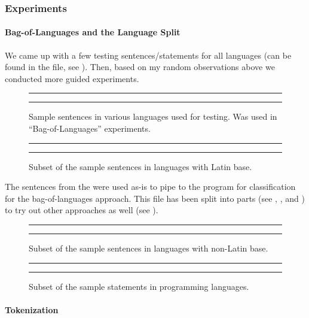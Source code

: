 \subsubsection{Experiments}

\paragraph{Bag-of-Languages and the Language Split}

We came up with a few testing sentences/statements for all languages
(can be found in the  file, see ).
Then, based on my random observations above we conducted more guided experiments.

\begin{figure}\small
\hrule\vskip4pt

\caption{Sample sentences in various languages used for testing. Was used in ``Bag-of-Languages'' experiments.}
\label{fig:lang-ident-sentences}
\vskip4pt\hrule
\end{figure}

\begin{figure}\small
\hrule\vskip4pt

\caption{Subset of the sample sentences in languages with Latin base.}
\label{fig:lang-ident-latin}
\vskip4pt\hrule
\end{figure}

The sentences from the  were used as-is to pipe to
the program for classification for the bag-of-languages approach. This
file has been split into parts (see , ,
and ) to try out other approaches as well (see ).

\begin{figure}\small
\hrule\vskip4pt

\caption{Subset of the sample sentences in languages with non-Latin base.}
\label{fig:lang-ident-nonlatin}
\vskip4pt\hrule
\end{figure}

\begin{figure}\small
\hrule\vskip4pt

\caption{Subset of the sample statements in programming languages.}
\label{fig:lang-ident-pls}
\vskip4pt\hrule
\end{figure}

\paragraph{Tokenization}

